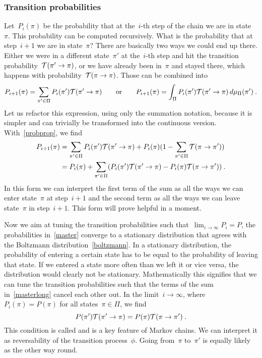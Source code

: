 \subsubsection{Transition probabilities}

Let~$P_i(\pi)$ be the probability that at the~$i$-th step of
the chain we are in state~$\pi$. This probability can be computed recursively.
What is the probability that at step~$i+1$ we are in state~$\pi$? There are
basically two ways we could end up there. Either we were in a different
state~$\pi'$ at the~$i$-th step and hit the transition probability~$\mathcal{T}(\pi' \to
\pi)$, or we have already been in~$\pi$ and stayed there, which happens with
probability~$\mathcal{T}(\pi \to \pi)$. Those can be combined into
%
\begin{equation}\label{master}
  P_{i+1}(\pi) = \sum_{\pi' \in \Pi} P_i(\pi') \mathcal{T}(\pi' \to \pi) \qquad\text{or}\qquad
  P_{i+1}(\pi) = \int_{\Pi} P_i(\pi') \mathcal{T}(\pi' \to \pi) \,d\mu_{\Pi}(\pi')\:.
\end{equation}
%
Let us refactor this expression, using only the summation notation, because it
is simpler and can trivially be transformed into the continuous version.
With~\eqref{probprop}, we find
%
\begin{align}\label{masterlong}
  P_{i+1}(\pi) &= \sum_{\pi' \in \Pi} P_i(\pi') \mathcal{T}(\pi' \to \pi) +
    P_i(\pi) (1 - \sum_{\pi' \in \Pi} \mathcal{T}(\pi \to \pi')) \\
  &= P_i(\pi) + \sum_{\pi' \in \Pi}
    (P_i(\pi') \mathcal{T}(\pi' \to \pi) - P_i(\pi) \mathcal{T}(\pi \to \pi'))\:.
\end{align}
%
In this form we can interpret the first term of the sum as all the ways we can
enter state~$\pi$ at step~$i+1$ and the second term as all the ways we can leave
state~$\pi$ in step~$i+1$. This form will prove helpful in a moment.

Now we aim at tuning the transition probabilities such that~$\lim_{i \to \infty}
P_i = P$, \ie{} the probabilities in~\eqref{master} converge to a stationary
distribution that agrees with the Boltzmann distribution~\eqref{boltzmann}. In a
stationary distribution, the probability of entering a certain state has to be
equal to the probability of leaving that state. If we entered a state more often
than we left it or vice versa, the distribution would clearly not be stationary.
Mathematically this signifies that we can tune the transition probabilities such
that the terms of the sum in~\eqref{masterlong} cancel each other out. In the
limit~$i \to \infty$, where~$P_i(\pi) = P(\pi)$ for all states~$\pi \in \Pi$, we
find
%
\begin{equation}\label{detbal}
  P(\pi') \mathcal{T}(\pi' \to \pi) = P(\pi) \mathcal{T}(\pi \to \pi')\:.
\end{equation}
%
This condition is called  and is a key feature of
Markov chains. We can interpret it as reversability of the transition
process~$\phi$. Going from~$\pi$ to~$\pi'$ is equally likely as the other way
round.

